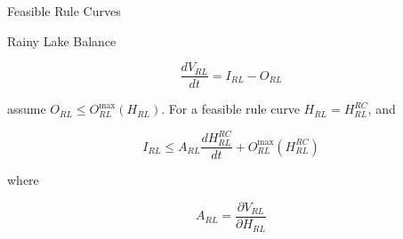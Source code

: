\documentclass[compress,english]{beamer}
\begin{document}
\begin{frame}{Feasible Rule Curves}

Rainy Lake Balance

\[\frac{dV_{RL}}{dt} = I_{RL} - O_{RL}\]

assume $O_{RL} \leq O^{\max}_{RL}(H_{RL})$. For a feasible rule curve $H_{RL} = {H}^{RC}_{RL}$, and

\[I_{RL} \leq A_{RL}\frac{dH^{RC}_{RL}}{dt} + O^{\max}_{RL}(H^{RC}_{RL})\]

where

\[A_{RL} = \frac{\partial V_{RL}}{\partial H_{RL}}\]

\end{frame}

\end{document}
